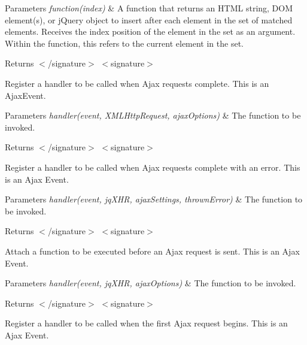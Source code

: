 \begin{DoxyParams}{Parameters}
{\em function(index)} & A function that returns an H\-T\-M\-L string, D\-O\-M element(s), or j\-Query object to insert after each element in the set of matched elements. Receives the index position of the element in the set as an argument. Within the function, this refers to the current element in the set.\\
\hline
\end{DoxyParams}
\begin{DoxyReturn}{Returns}
$<$/signature$>$ $<$signature$>$ 

Register a handler to be called when Ajax requests complete. This is an Ajax\-Event.
\end{DoxyReturn}

\begin{DoxyParams}{Parameters}
{\em handler(event, X\-M\-L\-Http\-Request, ajax\-Options)} & The function to be invoked.\\
\hline
\end{DoxyParams}
\begin{DoxyReturn}{Returns}
$<$/signature$>$ $<$signature$>$ 

Register a handler to be called when Ajax requests complete with an error. This is an Ajax Event.
\end{DoxyReturn}

\begin{DoxyParams}{Parameters}
{\em handler(event, jq\-X\-H\-R, ajax\-Settings, thrown\-Error)} & The function to be invoked.\\
\hline
\end{DoxyParams}
\begin{DoxyReturn}{Returns}
$<$/signature$>$ $<$signature$>$ 

Attach a function to be executed before an Ajax request is sent. This is an Ajax Event.
\end{DoxyReturn}

\begin{DoxyParams}{Parameters}
{\em handler(event, jq\-X\-H\-R, ajax\-Options)} & The function to be invoked.\\
\hline
\end{DoxyParams}
\begin{DoxyReturn}{Returns}
$<$/signature$>$ $<$signature$>$ 

Register a handler to be called when the first Ajax request begins. This is an Ajax Event.
\end{DoxyReturn}

